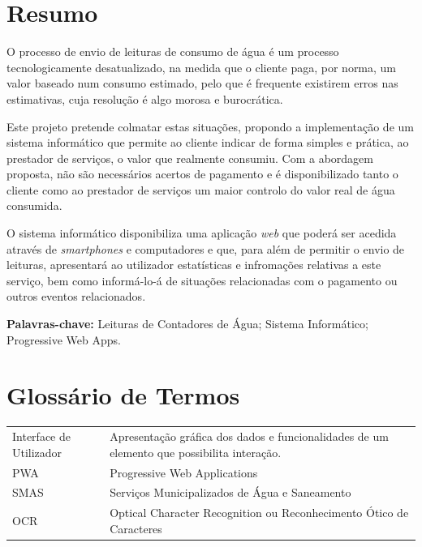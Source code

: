 \documentclass[a4paper,openright,twoside,11pt]{report}
\begin{document}
\chapter*{Resumo}
O processo de envio de leituras de consumo de água é um processo tecnologicamente desatualizado, na medida que o cliente paga, por norma, um valor baseado num consumo estimado, pelo que é frequente existirem erros nas estimativas, cuja resolução é algo morosa e burocrática.\par
Este projeto pretende colmatar estas situações, propondo a implementação de um sistema informático que permite ao cliente indicar de forma simples e prática, ao prestador de serviços, o valor que realmente consumiu. Com a abordagem proposta, não são necessários acertos de pagamento e é disponibilizado tanto o cliente como ao prestador de serviços um maior controlo do valor real de água consumida.\par
O sistema informático disponibiliza uma aplicação \textit{web} que poderá ser acedida através de \textit{smartphones} e computadores e que, para além de permitir o envio de leituras, apresentará ao utilizador estatísticas e infromações relativas a este serviço, bem como informá-lo-á de situações relacionadas com o pagamento ou outros eventos relacionados.
\vspace{1.5cm}

{\bf Palavras-chave:} Leituras de Contadores de Água; Sistema Informático; Progressive Web Apps.

\cleardoublepage %
\chapter*{Glossário de Termos}

\begin{tabular}[l]{l  p{11cm}} 

Interface de Utilizador & Apresentação gráfica dos dados e funcionalidades de um elemento que possibilita interação.\\ 

PWA  & Progressive Web Applications\\

SMAS & Serviços Municipalizados de Água e Saneamento\\

OCR & Optical Character Recognition ou Reconhecimento Ótico de Caracteres\\ 

\end{tabular}
\label{tab:req_utilizador}
\end{document}
